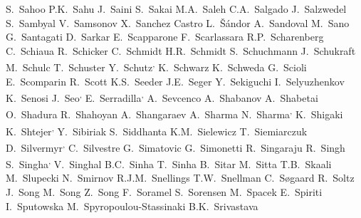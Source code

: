 \begin{flushleft}
S.~Sahoo\And
P.K.~Sahu\And
J.~Saini\And
S.~Sakai\And
M.A.~Saleh\And
C.A.~Salgado\And
J.~Salzwedel\And
S.~Sambyal\And
V.~Samsonov\And
X.~Sanchez Castro\And
L.~\v{S}\'{a}ndor\And
A.~Sandoval\And
M.~Sano\And
G.~Santagati\And
D.~Sarkar\And
E.~Scapparone\And
F.~Scarlassara\And
R.P.~Scharenberg\And
C.~Schiaua\And
R.~Schicker\And
C.~Schmidt\And
H.R.~Schmidt\And
S.~Schuchmann\And
J.~Schukraft\And
M.~Schulc\And
T.~Schuster\And
Y.~Schutz\textsuperscript{,}\And
K.~Schwarz\And
K.~Schweda\And
G.~Scioli\And
E.~Scomparin\And
R.~Scott\And
K.S.~Seeder\And
J.E.~Seger\And
Y.~Sekiguchi\And
I.~Selyuzhenkov\And
K.~Senosi\And
J.~Seo\textsuperscript{,}\And
E.~Serradilla\textsuperscript{,}\And
A.~Sevcenco\And
A.~Shabanov\And
A.~Shabetai\And
O.~Shadura\And
R.~Shahoyan\And
A.~Shangaraev\And
A.~Sharma\And
N.~Sharma\textsuperscript{,}\And
K.~Shigaki\And
K.~Shtejer\textsuperscript{,}\And
Y.~Sibiriak\And
S.~Siddhanta\And
K.M.~Sielewicz\And
T.~Siemiarczuk\And
D.~Silvermyr\textsuperscript{,}\And
C.~Silvestre\And
G.~Simatovic\And
G.~Simonetti\And
R.~Singaraju\And
R.~Singh\And
S.~Singha\textsuperscript{,}\And
V.~Singhal\And
B.C.~Sinha\And
T.~Sinha\And
B.~Sitar\And
M.~Sitta\And
T.B.~Skaali\And
M.~Slupecki\And
N.~Smirnov\And
R.J.M.~Snellings\And
T.W.~Snellman\And
C.~S{\o}gaard\And
R.~Soltz\And
J.~Song\And
M.~Song\And
Z.~Song\And
F.~Soramel\And
S.~Sorensen\And
M.~Spacek\And
E.~Spiriti\And
I.~Sputowska\And
M.~Spyropoulou-Stassinaki\And
B.K.~Srivastava\And

\end{flushleft}
